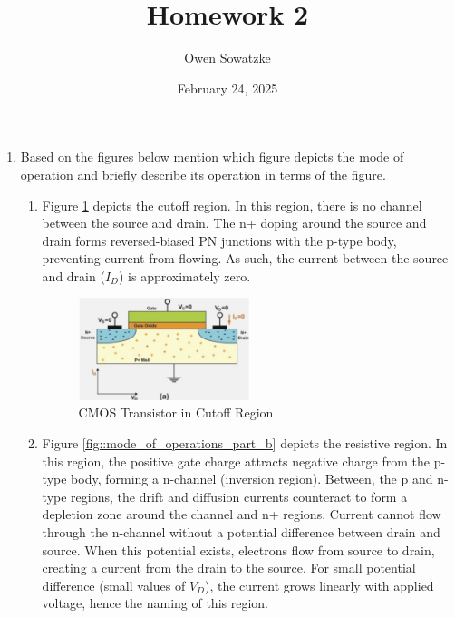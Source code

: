 \documentclass[fleqn]{article}
\title{Homework 2}
\author{Owen Sowatzke}
\date{February 24, 2025}
\newcommand{\zerodisplayskip}{
	\setlength{\abovedisplayskip}{0pt}%
	\setlength{\belowdisplayskip}{0pt}%
	\setlength{\abovedisplayshortskip}{0pt}%
	\setlength{\belowdisplayshortskip}{0pt}%
	\setlength{\mathindent}{0pt}}
\begin{document}
	\offinterlineskip
	\setlength{\lineskip}{12pt}
	\zerodisplayskip
	\maketitle
	
	\begin{enumerate}
		\item Based on the figures below mention which figure depicts the mode of operation and briefly describe its operation in terms of the figure.
		
		\begin{enumerate}
		
			\item Figure \ref{fig::mode_of_operations_part_a} depicts the cutoff region. In this region, there is no channel between the source and drain. The n+ doping around the source and drain forms reversed-biased PN junctions with the p-type body, preventing current from flowing. As such, the current between the source and drain ($I_{D}$) is approximately zero.
			
			\begin{figure}[H]				
				\centerline{\includegraphics[width=0.5\textwidth]{mode_of_operations_part_a.png}}
				\caption{CMOS Transistor in Cutoff Region}
				\label{fig::mode_of_operations_part_a}
			\end{figure}
		
			\item Figure \ref{fig::mode_of_operations_part_b} depicts the resistive region. In this region, the positive gate charge attracts negative charge from the p-type body, forming a n-channel (inversion region). Between, the p and n-type regions, the drift and diffusion currents counteract to form a depletion zone around the channel and n+ regions. Current cannot flow through the n-channel without a potential difference between drain and source. When this potential exists, electrons flow from source to drain, creating a current from the drain to the source. For small potential difference (small values of $V_D$), the current grows linearly with applied voltage, hence the naming of this region.
			

\end{enumerate}
\end{enumerate}
\end{document}
